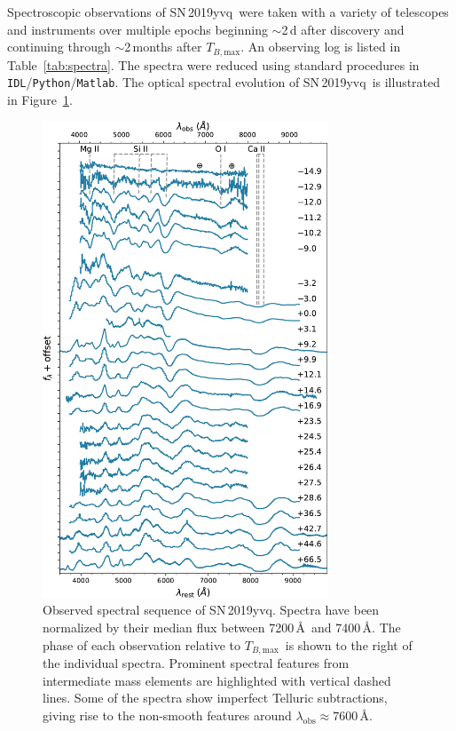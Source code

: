 \documentclass[twocolumn]{aastex63}
\newcommand{\tbmax}{$T_{B,\mathrm{max}}$}
\newcommand{\sn}{SN\,2019yvq}
\begin{document}
Spectroscopic observations of \sn\ were taken with a variety of telescopes
and instruments over multiple epochs beginning $\sim$2\,d after discovery
and continuing through $\sim$2\,months after \tbmax. An observing log is
listed in Table~\ref{tab:spectra}. The spectra were reduced using standard
procedures in \texttt{IDL}/\texttt{Python}/\texttt{Matlab}. The optical
spectral evolution of \sn\ is illustrated in Figure~\ref{fig:spec_evo}.



\begin{figure}
    \centering
    \includegraphics[width=3.35in]{./figures/spec_evo.pdf}
    \caption{Observed spectral sequence of \sn. Spectra have been normalized
    by their median flux between 7200\,\AA\ and 7400\,\AA. The phase of each
    observation relative to \tbmax\ is shown to the right of the individual
    spectra. Prominent spectral features from intermediate mass elements are
    highlighted with vertical dashed lines. Some of the spectra show
    imperfect Telluric subtractions, giving rise to the non-smooth features
    around $\lambda_\mathrm{obs} \approx 7600$\,\AA.}
    \label{fig:spec_evo}
\end{figure}
\end{document}
